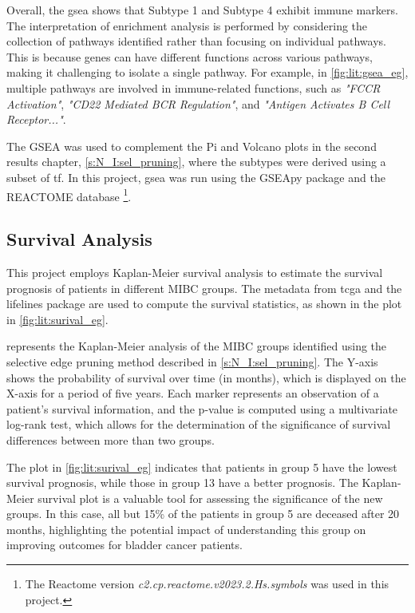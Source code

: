 Overall, the \acrshort{gsea} shows that Subtype 1 and Subtype 4 exhibit immune markers. The interpretation of enrichment analysis is performed by considering the collection of pathways identified rather than focusing on individual pathways. This is because genes can have different functions across various pathways, making it challenging to isolate a single pathway. For example, in \cref{fig:lit:gsea_eg}, multiple pathways are involved in immune-related functions, such as \textit{"FCCR Activation"}, \textit{"CD22 Mediated BCR Regulation"}, and \textit{"Antigen Activates B Cell Receptor..."}. 

The GSEA was used to complement the Pi and Volcano plots in the second results chapter, \cref{s:N_I:sel_pruning}, where the subtypes were derived using a subset of \acrlong{tf}. In this project, \acrfull{gsea} was run using the GSEApy package \citep{Fang2023-ec} and the REACTOME database \cite{Milacic2024-yt}\footnote{The Reactome version \textit{c2.cp.reactome.v2023.2.Hs.symbols} was used in this project.}.


\subsection{Survival Analysis} \label{s:lit:survival}

This project employs Kaplan-Meier survival analysis \cite{Kaplan1958-iy} to estimate the survival prognosis of patients in different MIBC groups. The metadata from \acrlong{tcga} and the lifelines package \citep{Davidson-Pilon2019-fu} are used to compute the survival statistics, as shown in the plot in \cref{fig:lit:surival_eg}.

 represents the Kaplan-Meier analysis of the MIBC groups identified using the selective edge pruning method described in \cref{s:N_I:sel_pruning}. The Y-axis shows the probability of survival over time (in months), which is displayed on the X-axis for a period of five years. Each marker represents an observation of a patient's survival information, and the p-value is computed using a multivariate log-rank test, which allows for the determination of the significance of survival differences between more than two groups.

The plot in \cref{fig:lit:surival_eg} indicates that patients in group 5 have the lowest survival prognosis, while those in group 13 have a better prognosis. The Kaplan-Meier survival plot is a valuable tool for assessing the significance of the new groups. In this case, all but 15\% of the patients in group 5 are deceased after 20 months, highlighting the potential impact of understanding this group on improving outcomes for bladder cancer patients.

